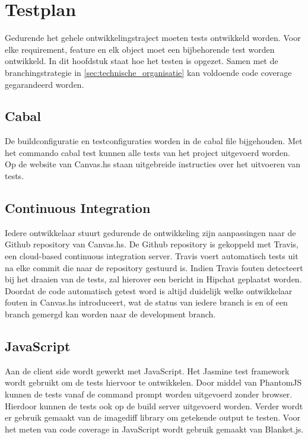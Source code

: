 \chapter{Testplan} \label{hoofdstuk:testplan}
Gedurende het gehele ontwikkelingstraject moeten tests ontwikkeld worden. Voor elke requirement, feature en elk object moet een bijbehorende test worden ontwikkeld. In dit hoofdstuk staat hoe het testen is opgezet. Samen met de branchingstrategie in \autoref{sec:technische_organisatie} kan voldoende code coverage gegarandeerd worden.

\section{Cabal}
De buildconfiguratie en testconfiguraties worden in de cabal file bijgehouden. Met het commando cabal test kunnen alle tests van het project uitgevoerd worden. Op de website van Canvas.hs staan uitgebreide instructies over het uitvoeren van tests.

\section{Continuous Integration}
Iedere ontwikkelaar stuurt gedurende de ontwikkeling zijn aanpassingen naar de Github repository van Canvas.hs. De Github repository is gekoppeld met Travis, een cloud-based continuous integration server. Travis voert automatisch tests uit na elke commit die naar de repository gestuurd is. Indien Travis fouten detecteert bij het draaien van de tests, zal hierover een bericht in Hipchat geplaatst worden. Doordat de code automatisch getest word is altijd duidelijk welke ontwikkelaar fouten in Canvas.hs introduceert, wat de status van iedere branch is en of een branch gemergd kan worden naar de development branch.


\section{JavaScript} 
Aan de client side wordt gewerkt met JavaScript. Het Jasmine test framework wordt gebruikt om de tests hiervoor te ontwikkelen. Door middel van PhantomJS kunnen de tests vanaf de command prompt worden uitgevoerd zonder browser. Hierdoor kunnen de tests ook op de build server uitgevoerd worden. Verder wordt er gebruik gemaakt van de imagediff library om getekende output te testen. Voor het meten van code coverage in JavaScript wordt gebruik gemaakt van Blanket.js.

